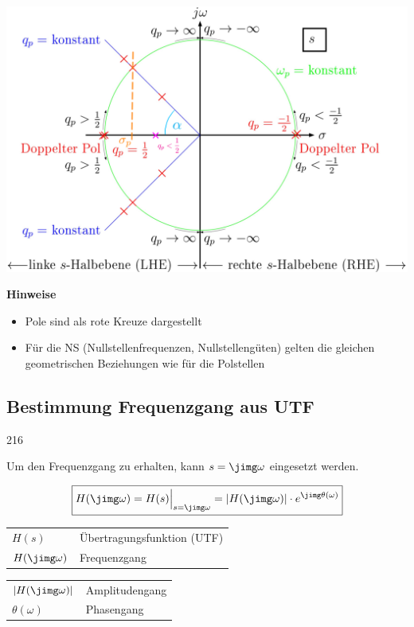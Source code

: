 \begin{minipage}[c]{0.55\columnwidth}
    \includegraphics[width=\columnwidth]{images/pole_nullstellen_koeffizienten.png}
\end{minipage}
\hfill
\begin{minipage}[c]{0.42\columnwidth}
    \raggedright%
    \textbf{Hinweise}
    \begin{itemize}
        \item Pole sind als rote Kreuze dargestellt
        \item Für die NS (Nullstellenfrequenzen, Nullstellengüten) gelten die gleichen
            geometrischen Beziehungen wie für die Polstellen
    \end{itemize}
\end{minipage}




\subsection{Bestimmung Frequenzgang aus UTF}{216}

Um den Frequenzgang zu erhalten, kann $s = \jimg \omega$ eingesetzt werden.

$$ \boxed{ H(\jimg \omega) = H(s) \Big|_{s = \jimg \omega} = |H(\jimg \omega)| \cdot e^{\jimg \theta(\omega)} } $$

\begin{center}
    \begin{tabular}{ll}
        $H(s)$              & Übertragungsfunktion (UTF) \\
        $H(\jimg \omega)$       & Frequenzgang 
    \end{tabular}\hspace{5mm}
    \begin{tabular}{ll}
        $|H(\jimg \omega)|$     & Amplitudengang \\
        $\theta(\omega)$    & Phasengang
    \end{tabular}
\end{center}

